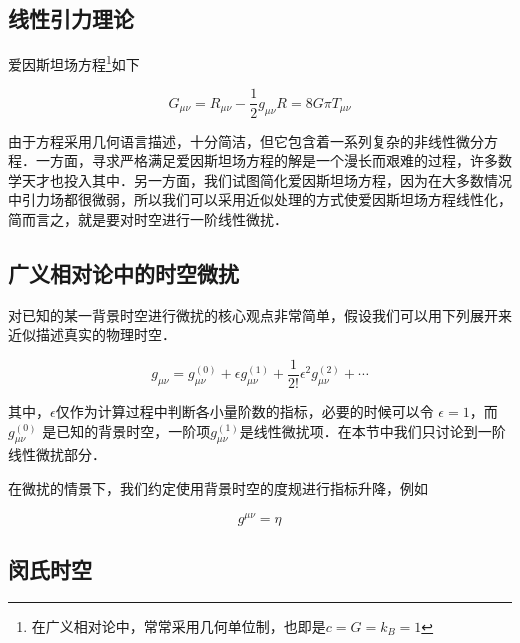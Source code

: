 
\begin{issues}
\issueMissDepend
\issueDraft
\end{issues}



\subsection{线性引力理论}
爱因斯坦场方程\footnote{在广义相对论中，常常采用几何单位制，也即是$c=G=k_B=1$}如下

\begin{equation}
G_{\mu \nu} = R_{\mu \nu} - \frac{1}{2}g_{\mu\nu}R = 8 G\pi T_{\mu\nu}
\end{equation}

由于方程采用几何语言描述，十分简洁，但它包含着一系列复杂的非线性微分方程．一方面，寻求严格满足爱因斯坦场方程的解是一个漫长而艰难的过程，许多数学天才也投入其中．另一方面，我们试图简化爱因斯坦场方程，因为在大多数情况中引力场都很微弱，所以我们可以采用近似处理的方式使爱因斯坦场方程线性化，简而言之，就是要对时空进行一阶线性微扰．


\subsection{广义相对论中的时空微扰}

对已知的某一背景时空进行微扰的核心观点非常简单，假设我们可以用下列展开来近似描述真实的物理时空．

\begin{equation}
g_{\mu\nu}=g^{(0)}_{\mu\nu} + \epsilon g^{(1)}_{\mu\nu} + \frac{1}{2!}\epsilon^2 g^{(2)}_{\mu\nu}+\cdots
\end{equation}

其中，$\epsilon $仅作为计算过程中判断各小量阶数的指标，必要的时候可以令 $\epsilon = 1 $，而$g^{(0)}_{\mu\nu} $ 是已知的背景时空，一阶项$g^{(1)}_{\mu\nu}$是线性微扰项．在本节中我们只讨论到一阶线性微扰部分．

在微扰的情景下，我们约定使用背景时空的度规进行指标升降，例如

\begin{equation}
g^{\mu\nu} = \eta^{}
\end{equation}



\subsection{闵氏时空}

